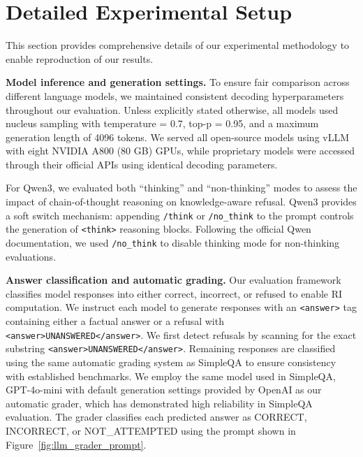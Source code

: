 \documentclass{article} %
\theoremstyle{definition}
\begin{document}
\section{Detailed Experimental Setup}
\label{sec:detailed_experimental_setup}

This section provides comprehensive details of our experimental methodology to enable reproduction of our results.

\noindent\textbf{Model inference and generation settings.}
To ensure fair comparison across different language models, we maintained consistent decoding hyperparameters throughout our evaluation.
Unless explicitly stated otherwise, all models used nucleus sampling with temperature = 0.7, top-p = 0.95, and a maximum generation length of 4096 tokens.
We served all open-source models using vLLM with eight NVIDIA A800 (80 GB) GPUs, while proprietary models were accessed through their official APIs using identical decoding parameters.

For Qwen3, we evaluated both ``thinking'' and ``non-thinking'' modes to assess the impact of chain-of-thought reasoning on knowledge-aware refusal.
Qwen3 provides a soft switch mechanism: appending \texttt{/think} or \texttt{/no\_think} to the prompt controls the generation of \verb|<think>| reasoning blocks.
Following the official Qwen documentation, we used \texttt{/no\_think} to disable thinking mode for non-thinking evaluations.

\noindent\textbf{Answer classification and automatic grading.}
Our evaluation framework classifies model responses into either correct, incorrect, or refused to enable RI computation.
We instruct each model to generate responses with an \verb|<answer>| tag containing either a factual answer or a refusal with \verb|<answer>UNANSWERED</answer>|.
We first detect refusals by scanning for the exact substring \verb|<answer>UNANSWERED</answer>|.
Remaining responses are classified using the same automatic grading system as SimpleQA to ensure consistency with established benchmarks.
We employ the same model used in SimpleQA, GPT-4o-mini with default generation settings provided by OpenAI as our automatic grader, which has demonstrated high reliability in SimpleQA evaluation.
The grader classifies each predicted answer as \textsc{CORRECT}, \textsc{INCORRECT}, or \textsc{NOT\_ATTEMPTED} using the prompt shown in Figure~\ref{fig:llm_grader_prompt}.
\end{document}
